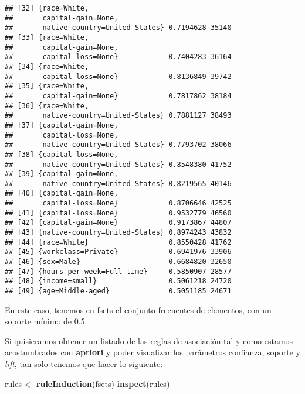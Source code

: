 \documentclass[]{article}
\newenvironment{Shaded}{\begin{snugshade}}{\end{snugshade}}
\newcommand{\KeywordTok}[1]{\textcolor[rgb]{0.13,0.29,0.53}{\textbf{#1}}}
\newcommand{\StringTok}[1]{\textcolor[rgb]{0.31,0.60,0.02}{#1}}
\newcommand{\NormalTok}[1]{#1}
\begin{document}
\begin{verbatim}
## [32] {race=White,                                  
##       capital-gain=None,                           
##       native-country=United-States} 0.7194628 35140
## [33] {race=White,                                  
##       capital-gain=None,                           
##       capital-loss=None}            0.7404283 36164
## [34] {race=White,                                  
##       capital-loss=None}            0.8136849 39742
## [35] {race=White,                                  
##       capital-gain=None}            0.7817862 38184
## [36] {race=White,                                  
##       native-country=United-States} 0.7881127 38493
## [37] {capital-gain=None,                           
##       capital-loss=None,                           
##       native-country=United-States} 0.7793702 38066
## [38] {capital-loss=None,                           
##       native-country=United-States} 0.8548380 41752
## [39] {capital-gain=None,                           
##       native-country=United-States} 0.8219565 40146
## [40] {capital-gain=None,                           
##       capital-loss=None}            0.8706646 42525
## [41] {capital-loss=None}            0.9532779 46560
## [42] {capital-gain=None}            0.9173867 44807
## [43] {native-country=United-States} 0.8974243 43832
## [44] {race=White}                   0.8550428 41762
## [45] {workclass=Private}            0.6941976 33906
## [46] {sex=Male}                     0.6684820 32650
## [47] {hours-per-week=Full-time}     0.5850907 28577
## [48] {income=small}                 0.5061218 24720
## [49] {age=Middle-aged}              0.5051185 24671
\end{verbatim}

En este caso, tenemos en fsets el conjunto frecuentes de elementos, con
un soporte mínimo de 0.5

Si quisieramos obtener un listado de las reglas de asociación tal y como
estamos acostumbrados con \textbf{apriori} y poder visualizar los
parámetros confianza, soporte y \emph{lift}, tan solo tenemos que hacer
lo siguiente:

\begin{Shaded}
\begin{Highlighting}[]
\NormalTok{rules <-}\StringTok{ }\KeywordTok{ruleInduction}\NormalTok{(fsets)}
\KeywordTok{inspect}\NormalTok{(rules)}
\end{Highlighting}
\end{Shaded}
\end{document}
